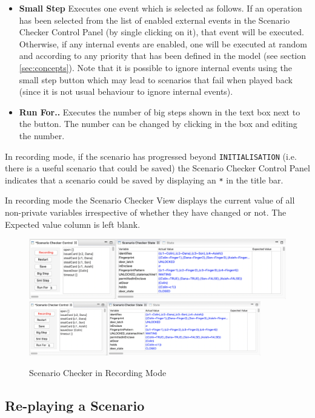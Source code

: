\begin{itemize}
	\item \textbf{Small Step}  Executes one event which is selected as follows. If an operation has been selected from the list of enabled external events in the Scenario Checker Control Panel (by single clicking on it), that event will be executed. Otherwise, if any internal events are enabled, one will be executed at random and according to any priority that has been defined in the model (see section \ref{sec:concepts}). Note that it is possible to ignore internal events using the small step button which may lead to scenarios that fail when played back (since it is not usual behaviour to ignore internal events).
	\item \textbf{Run For..}  Executes the number of big steps shown in the text box next to the button. The number can be changed by clicking in the box and editing the number.
\end{itemize}

In recording mode, if the scenario has progressed beyond \texttt{INITIALISATION} (i.e. there is a useful scenario that could be saved) the Scenario Checker Control Panel indicates that a scenario could be saved by displaying an \texttt{*} in the title bar.

In recording mode the Scenario Checker View displays the current value of all non-private variables irrespective of whether they have changed or not.
The Expected value column is left blank.

\begin{figure}[!htbp]
	\centering
	\ifplastex
	\includegraphics[width=900]{figures/recording}
	\else
	\includegraphics[width=0.9\textwidth]{figures/recording}
	\fi
	\caption{Scenario Checker in Recording Mode}
	\label{fig:recording}
\end{figure}

\subsection{Re-playing a Scenario}
\label{sec:playback}

